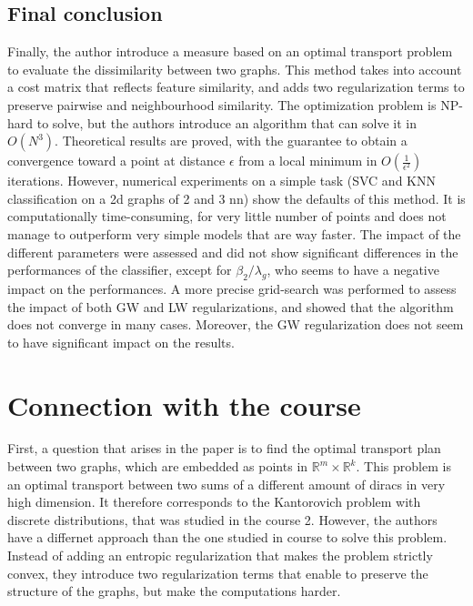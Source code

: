 \documentclass[a4paper,11pt]{article}
\begin{document}
\subsection{Final conclusion}

Finally, the author introduce a measure based on an optimal transport problem to evaluate the dissimilarity between two graphs. 
This method takes into account a cost matrix that reflects feature similarity, and adds two regularization terms to preserve pairwise and neighbourhood similarity. 
The optimization problem is NP-hard to solve, but the authors introduce an algorithm that can solve it in $O(N^3)$. 
Theoretical results are proved, with the guarantee to obtain a convergence toward a point at distance $\epsilon$ from a local minimum in $O(\frac{1}{\epsilon^2})$ iterations. 
However, numerical experiments on a simple task (SVC and KNN classification on a 2d graphs of 2 and 3 nn) show the defaults of this method. 
It is computationally time-consuming, for very little number of points and does not manage to outperform very simple models that are way faster. 
The impact of the different parameters were assessed and did not show significant differences in the performances of the classifier, except for $\beta_2/\lambda_g$, who seems to have a negative impact on the performances. 
A more precise grid-search was performed to assess the impact of both GW and LW regularizations, and showed that the algorithm does not converge in many cases. 
Moreover, the GW regularization does not seem to have significant impact on the results.



\section{Connection with the course}

First, a question that arises in the paper is to find the optimal transport plan between two graphs, which are embedded as points in $\mathbb{R}^m \times \mathbb{R}^k$.
This problem is an optimal transport between two sums of a different amount of diracs in very high dimension. 
It therefore corresponds to the Kantorovich problem with discrete distributions, that was studied in the course 2. 
However, the authors have a differnet approach than the one studied in course to solve this problem. 
Instead of adding an entropic regularization that makes the problem strictly convex, they introduce two regularization terms that enable to preserve the structure of the graphs, but make the computations harder. 
\end{document}
